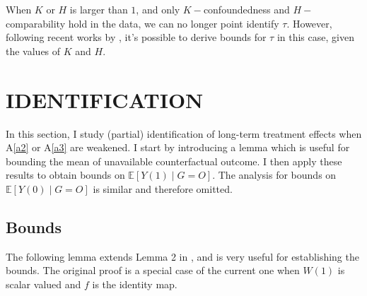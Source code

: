 \documentclass[12pt]{article}
\newcommand{\Ep}{\mathbb{E}}
\begin{document}
	When $K$ or $H$ is larger than $1$, and only $K-$confoundedness and $H-$comparability hold in the data, we can no longer point identify $\tau$. However, following recent works by \textcite{rosenbaum2002overt, masten2018identification,yadlowsky2018bounds}, it's possible to derive bounds for $\tau$ in this case, given the values of $K$ and $H$.
	
	\section{IDENTIFICATION}
	
	In this section, I study (partial) identification of long-term treatment effects when A\ref{a2} or A\ref{a3} are weakened. I start by introducing a lemma which is useful for bounding the mean of unavailable counterfactual outcome. I then apply these results to obtain bounds on $\Ep[Y(1) \mid G = O]$. The analysis for bounds on $\Ep[Y(0) \mid G = O]$ is similar and therefore omitted.
	
	\subsection{Bounds}
	
	The following lemma extends Lemma 2 in \textcite{yadlowsky2018bounds}, and is very useful for establishing the bounds. The original proof is a special case of the current one when $W(1)$ is scalar valued and $f$ is the identity map.
	
\end{document}
